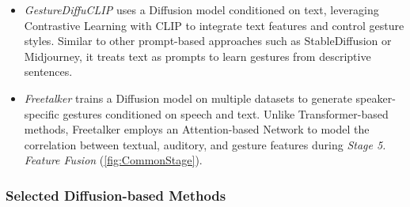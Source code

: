 \begin{itemize}
	\item \textit{GestureDiffuCLIP} \cite{ao2023gesturediffuclip} uses a Diffusion model conditioned on text, leveraging Contrastive Learning with CLIP to integrate text features and control gesture styles. Similar to other prompt-based approaches such as StableDiffusion or Midjourney, it treats text as prompts to learn gestures from descriptive sentences.
	
	\item \textit{Freetalker} \cite{yang2024freetalker} trains a Diffusion model on multiple datasets to generate speaker-specific gestures conditioned on speech and text. Unlike Transformer-based methods, Freetalker employs an Attention-based Network to model the correlation between textual, auditory, and gesture features during \textit{Stage 5. Feature Fusion} (\autoref{fig:CommonStage}).
\end{itemize}


\vspace{-0.2cm}
\subsubsection{Selected Diffusion-based Methods}


